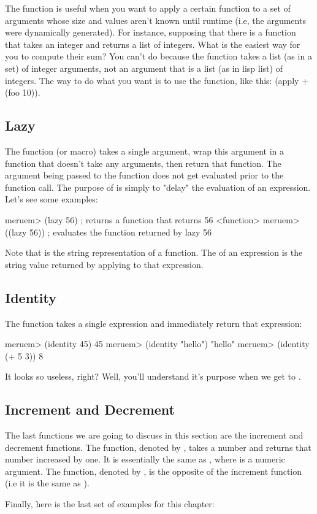The  function is useful when you want to apply a certain function to a set of arguments whose size and values aren't known until runtime (i.e, the arguments were dynamically generated). For instance, supposing that there is a function  that takes an integer and returns a list of integers. What is the easiest way for you to compute their sum? You can't do  because the \code{+} function takes a list (as in a set) of integer arguments, not an argument that is a list (as in lisp list)  of integers. The way to do what you want is to use the  function, like this: (apply + (foo 10)).

\subsection{Lazy}
The  function (or macro) takes a single argument, wrap this argument in a function that doesn't take any arguments, then return that function. The argument being passed to the  function does not get evaluated prior to the function call. The purpose of  is simply to "delay" the evaluation of an expression. Let's see some examples:

\begin{REPL}
meruem> (lazy 56)  ; returns a function that returns 56
<function>
meruem> ((lazy 56))  ; evaluates the function returned by lazy
56
\end{REPL}

Note that  is the string representation of a function. The  of an expression is the string value returned by applying  to that expression.

\subsection{Identity}
\label{sec:identity}
The  function takes a single expression and immediately return that expression:

\begin{REPL}
meruem> (identity 45)
45
meruem> (identity "hello")
"hello"
meruem> (identity (+ 5 3))
8
\end{REPL}

It looks so useless, right? Well, you'll understand it's purpose when we get to .

\subsection{Increment and Decrement}
The last functions we are going to discuss in this section are the increment and decrement functions. The  function, denoted by , takes a number and returns that number increased by one. It is essentially the same as , where  is a numeric argument. The  function, denoted by , is the opposite of the increment function (i.e it is the same as ). 


Finally, here is the last set of examples for this chapter:

\begin{REPL}
meruem> (inc 67)
68
meruem> (dec 30)
29
meruem> (inc 9.8)
10.8
meruem> (inc \a)
An error has occurred. Invalid Type. Not a Number: a
Source: .home.melvic.meruem.meruem.prelude [1:6}]
(inc \a)
     ^
\end{REPL}
